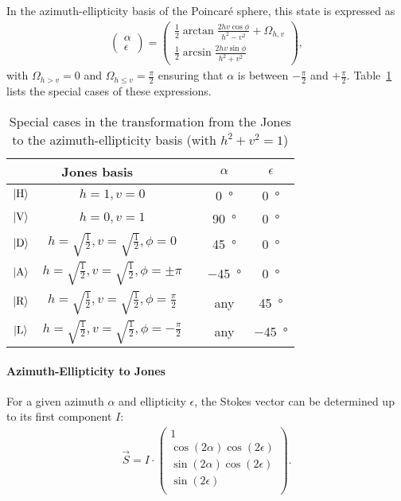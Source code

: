In the azimuth-ellipticity basis of the Poincaré sphere, this state is expressed as
\begin{align}
    \begin{pmatrix}\alpha \\ \epsilon \end{pmatrix} =
    \begin{pmatrix}
        \frac{1}{2} \arctan \frac{2hv \cos \phi}{h^2 - v^2} + \Omega_{h, v}\\
        \frac{1}{2} \arcsin \frac{2hv\sin\phi}{h^2 + v^2}
    \end{pmatrix}
    ,
\end{align}
with $\Omega_{h > v} = 0$ and $\Omega_{h \leq v} = \frac{\pi}{2}$ ensuring that $\alpha$ is between $-\frac{\pi}{2}$ and $+\frac{\pi}{2}$. Table~\ref{tab:jones_to_ae_special_cases} lists the special cases of these expressions.
\begin{table}
    \centering
    \begin{tabular}{ccccc}
        \toprule
        \multicolumn{2}{c}{Jones basis} && $\alpha$ & $\epsilon$ \\
        \toprule
        $\Ket{\text{H}}$ & $h = 1, v = 0$ && \SI[]{0}{\degree} & \SI[]{0}{\degree} \\
        $\Ket{\text{V}}$ & $h = 0, v = 1$ && \SI[]{+90}{\degree} & \SI[]{0}{\degree} \\
        $\Ket{\text{D}}$ & $h = \sqrt{\frac{1}{2}}, v = \sqrt{\frac{1}{2}}, \phi = 0$ && \SI[]{+45}{\degree} & \SI[]{0}{\degree} \\
        $\Ket{\text{A}}$ & $h = \sqrt{\frac{1}{2}}, v = \sqrt{\frac{1}{2}}, \phi = \pm\pi$ && \SI[]{-45}{\degree} & \SI[]{0}{\degree} \\
        $\Ket{\text{R}}$ & $h = \sqrt{\frac{1}{2}}, v = \sqrt{\frac{1}{2}}, \phi = \frac{\pi}{2}$ && any & \SI[]{+45}{\degree} \\
        $\Ket{\text{L}}$ & $h = \sqrt{\frac{1}{2}}, v = \sqrt{\frac{1}{2}}, \phi = -\frac{\pi}{2}$ && any & \SI[]{-45}{\degree} \\
        \bottomrule
    \end{tabular}
    \caption{Special cases in the transformation from the Jones to the azimuth-ellipticity basis (with $h^2 + v^2 = 1$)}   
    \label{tab:jones_to_ae_special_cases}
\end{table}

\paragraph*{Azimuth-Ellipticity to Jones}
For a given azimuth $\alpha$ and ellipticity $\epsilon$, the Stokes vector can be determined up to its first component $I$:
\begin{align}
    \vec S = I \cdot 
    \begin{pmatrix}
        1 \\
        \cos (2\alpha) \cos(2\epsilon) \\
        \sin (2\alpha) \cos(2\epsilon) \\
        \sin(2\epsilon) \\
    \end{pmatrix}.
\end{align}

